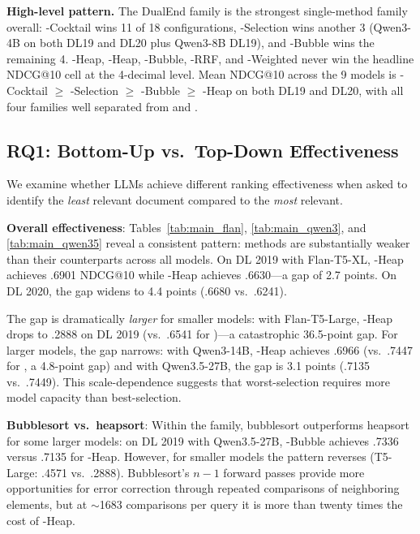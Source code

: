 \textbf{High-level pattern.} The DualEnd family is the strongest single-method family overall: \dualend{}-Cocktail wins 11 of 18 configurations, \dualend{}-Selection wins another 3 (Qwen3-4B on both DL19 and DL20 plus Qwen3-8B DL19), and \topdown{}-Bubble wins the remaining 4. \topdown{}-Heap, \bottomup{}-Heap, \bottomup{}-Bubble, \bidir{}-RRF, and \bidir{}-Weighted never win the headline NDCG@10 cell at the 4-decimal level. Mean NDCG@10 across the 9 models is \dualend{}-Cocktail $\geq$ \dualend{}-Selection $\geq$ \topdown{}-Bubble $\geq$ \topdown{}-Heap on both DL19 and DL20, with all four families well separated from \bottomup{} and \bidir{}.

\subsection{RQ1: Bottom-Up vs.\ Top-Down Effectiveness}
\label{sec:rq1}

We examine whether LLMs achieve different ranking effectiveness when asked to identify the \emph{least} relevant document compared to the \emph{most} relevant.

\textbf{Overall effectiveness}: Tables~\ref{tab:main_flan}, \ref{tab:main_qwen3}, and \ref{tab:main_qwen35} reveal a consistent pattern: \bottomup{} methods are substantially weaker than their \topdown{} counterparts across all models. On DL 2019 with Flan-T5-XL, \topdown{}-Heap achieves .6901 NDCG@10 while \bottomup{}-Heap achieves .6630---a gap of 2.7 points. On DL 2020, the gap widens to 4.4 points (.6680 vs.\ .6241).

The gap is dramatically \emph{larger} for smaller models: with Flan-T5-Large, \bottomup{}-Heap drops to .2888 on DL 2019 (vs.\ .6541 for \topdown{})---a catastrophic 36.5-point gap. For larger models, the gap narrows: with Qwen3-14B, \bottomup{}-Heap achieves .6966 (vs.\ .7447 for \topdown{}, a 4.8-point gap) and with Qwen3.5-27B, the gap is 3.1 points (.7135 vs.\ .7449). This scale-dependence suggests that worst-selection requires more model capacity than best-selection.

\textbf{Bubblesort vs.\ heapsort}: Within the \bottomup{} family, bubblesort outperforms heapsort for some larger models: on DL 2019 with Qwen3.5-27B, \bottomup{}-Bubble achieves .7336 versus .7135 for \bottomup{}-Heap. However, for smaller models the pattern reverses (T5-Large: .4571 vs.\ .2888). Bubblesort's $n-1$ forward passes provide more opportunities for error correction through repeated comparisons of neighboring elements, but at $\sim$1683 comparisons per query it is more than twenty times the cost of \topdown{}-Heap.

